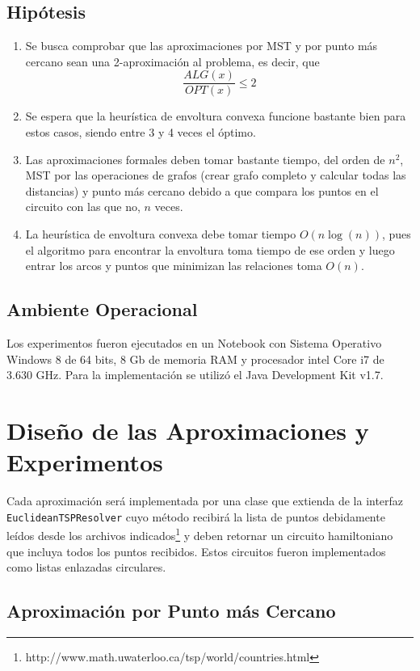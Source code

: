 \documentclass[12pt,letterpaper, margin = 3cm]{article}
\begin{document}
\subsection{Hipótesis}
\begin{enumerate}
\item Se busca comprobar que las aproximaciones por MST y por punto más cercano sean una 2-aproximación al problema, es decir, que \[ \frac{ALG(x)}{OPT(x)}\leq 2 \]
\item Se espera que la heurística de envoltura convexa funcione bastante bien para estos casos, siendo entre 3 y 4 veces el óptimo.
\item Las aproximaciones formales deben tomar bastante tiempo, del orden de $n^2$, MST por las operaciones de grafos (crear grafo completo y calcular todas las distancias) y punto más cercano debido a que compara los puntos en el circuito con las que no, $n$ veces.
\item La heurística de envoltura convexa debe tomar tiempo $O(n\log(n))$, pues el algoritmo para encontrar la envoltura toma tiempo de ese orden y luego entrar los arcos y puntos que minimizan las relaciones toma $O(n)$. 
\end{enumerate}

\subsection{Ambiente Operacional}
Los experimentos fueron ejecutados en un Notebook con Sistema Operativo Windows 8 de 64 bits, 8 Gb de
memoria RAM y procesador intel Core i7 de 3.630 GHz. Para la implementación se utilizó el Java Development Kit v1.7.

\newpage
\section{Diseño de las Aproximaciones y Experimentos}
Cada aproximación será implementada por una clase que extienda de la interfaz \verb+EuclideanTSPResolver+ cuyo método recibirá la lista de puntos debidamente leídos desde los archivos indicados\footnote{http://www.math.uwaterloo.ca/tsp/world/countries.html} y deben retornar un circuito hamiltoniano que incluya todos los puntos recibidos. Estos circuitos fueron implementados como listas enlazadas circulares.

\subsection{Aproximación por Punto más Cercano}
\end{document}
